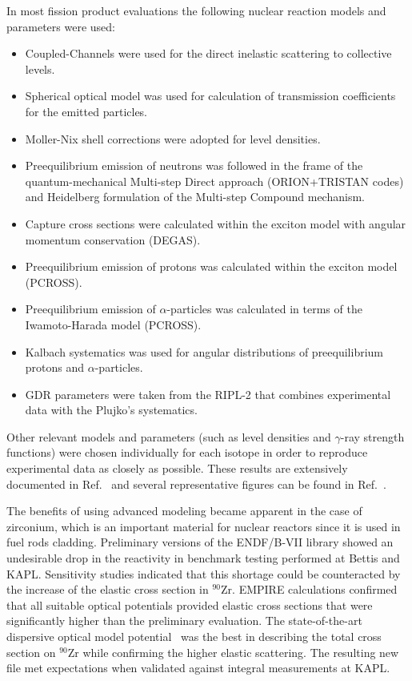 \documentclass[twocolumn,amsmath,amssymb,10pt,groupedaddress,a4paper]{revtex4}
\begin{document}
In most fission product evaluations the following nuclear reaction models and parameters were used:
\begin{itemize}
        \item Coupled-Channels were used for the direct inelastic scattering to collective levels.
        \item Spherical optical model was used for calculation of transmission coefficients for the emitted particles.
        \item Moller-Nix shell corrections were adopted for level densities.
        \item Preequilibrium emission of neutrons was followed in the frame of the quantum-mechanical Multi-step Direct approach (ORION+TRISTAN codes) and Heidelberg formulation of the Multi-step Compound mechanism.
        \item Capture cross sections were calculated within the exciton model with angular momentum conservation (DEGAS).
        \item Preequilibrium emission of protons was calculated within the exciton model (PCROSS).
        \item Preequilibrium emission of $\alpha$-particles was calculated in terms of the Iwamoto-Harada model (PCROSS).
        \item Kalbach systematics was used for angular distributions of preequilibrium protons and $\alpha$-particles.
        \item GDR parameters were taken from the RIPL-2 that combines experimental data with the Plujko's systematics.
\end{itemize}
\noindent Other relevant models and parameters (such as level densities and $\gamma$-ray strength functions) were chosen individually for each isotope in order to reproduce experimental data as closely as possible.
These results are extensively documented in Ref.~\cite{Kim:07} and several representative figures can be found in Ref.~\cite{ENDF-VII}.



The benefits of using advanced modeling became apparent in the case of zirconium, which is an important material for nuclear reactors since it is used in fuel rods cladding. Preliminary versions of the ENDF/B-VII library showed an undesirable drop in the reactivity in benchmark testing performed at Bettis and KAPL. Sensitivity studies indicated that this shortage could be counteracted by the increase of the elastic cross section in $^{90}$Zr. EMPIRE calculations confirmed that all suitable optical potentials provided elastic cross sections that were significantly higher than the preliminary evaluation.  The state-of-the-art  dispersive optical model potential~\cite{Capote:06, Capote:05, Soukhovitskii:05} was the best in describing the total cross section on $^{90}$Zr while confirming the higher elastic scattering. The resulting new file met expectations when validated against integral measurements at KAPL.
\end{document}
